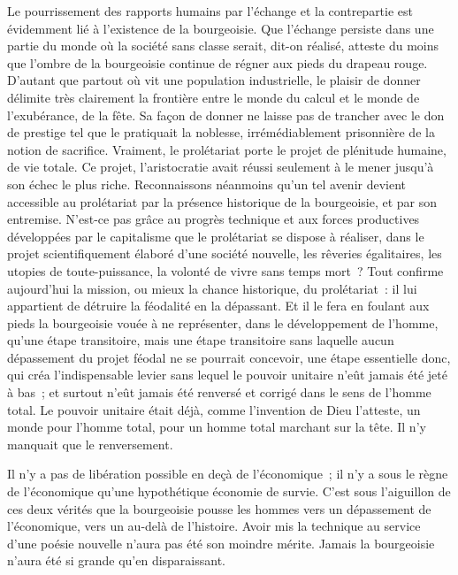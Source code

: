 \documentclass[french,twoside]{book} %
\begin{document}
Le pourrissement des rapports humains par l’échange et la contrepartie est évidemment lié à l’existence de la bourgeoisie. Que l’échange persiste dans une partie du monde où la société sans classe serait, dit-on réalisé, atteste du moins que l’ombre de la bourgeoisie continue de régner aux pieds du drapeau rouge. D’autant que partout où vit une population industrielle, le plaisir de donner délimite très clairement la frontière entre le monde du calcul et le monde de l’exubérance, de la fête. Sa façon de donner ne laisse pas de trancher avec le don de prestige tel que le pratiquait la noblesse, irrémédiablement prisonnière de la notion de sacrifice. Vraiment, le prolétariat porte le projet de plénitude humaine, de vie totale. Ce projet, l’aristocratie avait réussi seulement à le mener jusqu’à son échec le plus riche. Reconnaissons néanmoins qu’un tel avenir devient accessible au prolétariat par la présence historique de la bourgeoisie, et par son entremise. N’est-ce pas grâce au progrès technique et aux forces productives développées par le capitalisme que le prolétariat se dispose à réaliser, dans le projet scientifiquement élaboré d’une société nouvelle, les rêveries égalitaires, les utopies de toute-puissance, la volonté de vivre sans temps mort ? Tout confirme aujourd’hui la mission, ou mieux la chance historique, du prolétariat : il lui appartient de détruire la féodalité en la dépassant. Et il le fera en foulant aux pieds la bourgeoisie vouée à ne représenter, dans le développement de l’homme, qu’une étape transitoire, mais une étape transitoire sans laquelle aucun dépassement du projet féodal ne se pourrait concevoir, une étape essentielle donc, qui créa l’indispensable levier sans lequel le pouvoir unitaire n’eût jamais été jeté à bas ; et surtout n’eût jamais été renversé et corrigé dans le sens de l’homme total. Le pouvoir unitaire était déjà, comme l’invention de Dieu l’atteste, un monde pour l’homme total, pour un homme total marchant sur la tête. Il n’y manquait que le renversement.\par
Il n’y a pas de libération possible en deçà de l’économique ; il n’y a sous le règne de l’économique qu’une hypothétique économie de survie. C’est sous l’aiguillon de ces deux vérités que la bourgeoisie pousse les hommes vers un dépassement de l’économique, vers un au-delà de l’histoire. Avoir mis la technique au service d’une poésie nouvelle n’aura pas été son moindre mérite. Jamais la bourgeoisie n’aura été si grande qu’en disparaissant.
\end{document}
